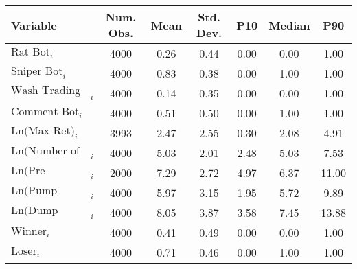\begin{tabular}{lcccccc}
\hline
Variable & Num. Obs. & Mean & Std. Dev. & P10 & Median & P90 \\
\hline
$\text{Rat Bot}_{i}$ & 4000 & 0.26 & 0.44 & 0.00 & 0.00 & 1.00 \\
$\text{Sniper Bot}_{i}$ & 4000 & 0.83 & 0.38 & 0.00 & 1.00 & 1.00 \\
$\text{Wash Trading Bot}_{i}$ & 4000 & 0.14 & 0.35 & 0.00 & 0.00 & 1.00 \\
$\text{Comment Bot}_{i}$ & 4000 & 0.51 & 0.50 & 0.00 & 1.00 & 1.00 \\
$\text{Ln(Max Ret)}_{i}$ & 3993 & 2.47 & 2.55 & 0.30 & 2.08 & 4.91 \\
$\text{Ln(Number of Traders)}_{i}$ & 4000 & 5.03 & 2.01 & 2.48 & 5.03 & 7.53 \\
$\text{Ln(Pre-Migration Duration)}_{i}$ & 2000 & 7.29 & 2.72 & 4.97 & 6.37 & 11.00 \\
$\text{Ln(Pump Duration)}_{i}$ & 4000 & 5.97 & 3.15 & 1.95 & 5.72 & 9.89 \\
$\text{Ln(Dump Duration)}_{i}$ & 4000 & 8.05 & 3.87 & 3.58 & 7.45 & 13.88 \\
$\text{Winner}_{i}$ & 4000 & 0.41 & 0.49 & 0.00 & 0.00 & 1.00 \\
$\text{Loser}_{i}$ & 4000 & 0.71 & 0.46 & 0.00 & 1.00 & 1.00 \\
\hline
\end{tabular}